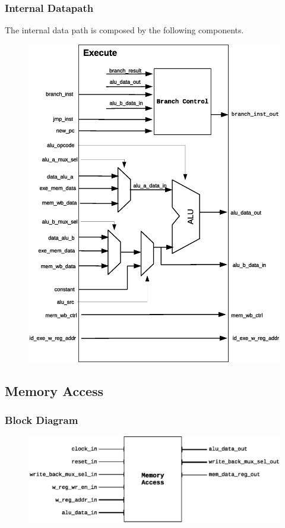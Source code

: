 \documentclass{article}
\begin{document}
  \subsubsection{Internal Datapath} 
  The internal data path is composed by the following components.

  \begin{figure}[H]
    \centering
    \includegraphics[width=.8\linewidth]{pictures/datapath/ex_datapath.eps}
  \end{figure}  

  \newpage
  \subsection{Memory Access}
  \subsubsection{Block Diagram}
  \begin{figure}[H]
    \centering
    \includegraphics[width=\linewidth]{pictures/blocks/mem_block.eps}
  \end{figure} 
\end{document}
